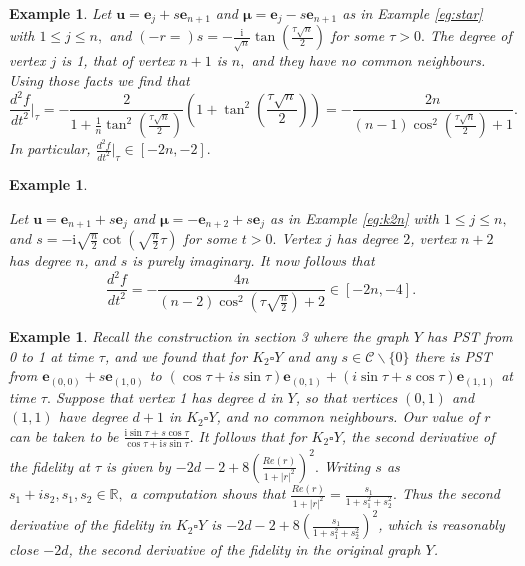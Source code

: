 \documentclass{article}
\numberwithin{equation}{section}
\newtheorem{ex}[lemma]{Example}
\newcommand{\be}{\mathbf e}
\newcommand{\bu}{\mathbf u}
\newcommand{\bmu}{{\boldsymbol{\mu}}}
\def\ii{\mathrm{i}}
\begin{document}
{\begin{ex}\label{eg:starsense} {\rm{
Let $\bu = \be_j+s\be_{n+1}$ and $ \bmu=\be_j-s\be_{n+1}$ as in Example \ref{eg:star} with $1\leq j\leq n,$ and $(-r=) s=-\frac{\ii}{\sqrt{n}}\tan\left(\frac{\tau \sqrt{n}}{2}\right)$ for some $\tau>0.$ The degree of vertex $j$ is 1, that of vertex $n+1$ is $n,$ and they have no common neighbours. 
Using those facts we find that $$\frac{d^2 f}{d t^2}\bigg|_{\tau} =  - 
\frac{2}{1+\frac{1}{n}\tan^2\left(\frac{\tau \sqrt{n}}{2}\right)}\left(
1+\tan^2\left(\frac{\tau \sqrt{n}}{2} \right)\right) = -
\frac{2n}{(n-1)\cos^2\left(\frac{\tau \sqrt{n}}{2}\right)+1}.$$ In particular,     $\frac{d^2 f}{d t^2}\big|_{\tau} \in [-2n,-2].$  }}
\end{ex}

\begin{ex}\label{eg:k2nsense} \rm{Let $\bu=\be_{n+1}+s\be_j$ and $\bmu=-\be_{n+2}+s\be_j$ as in Example \ref{eg:k2n} with $1\leq j\leq n,$ and 
$s=-\ii \sqrt{\frac{n}{2}} \cot\left( \sqrt{\frac{n}{2}} \tau \right)$ for some $t>0.$ Vertex $j$ has degree $2$, vertex $n+2$ has degree $n$, and $s$ is purely imaginary. It now follows that 
$$\frac{d^2 f}{d t^2} = -\frac{4n}{(n-2)\cos^2\left(\tau \sqrt{\frac{n}{2}}\right)  + 2} \in [-2n, -4]. 
$$

}
\end{ex}

\begin{ex}\label{ex:sensitivity_close}\rm{
Recall the  construction in section 3 where the graph $Y$ has PST from 0 to 1 at time $\tau$, and we found that for $K_2 \square Y $ and any $s \in \mathcal{C}\backslash \{0\}$ there is PST from $\be_{(0,0)} + s \be_{(1,0)}$ to  $  (\cos \tau +i s \sin \tau)\be_{(0,1)} + (i \sin \tau + s \cos \tau)\be_{(1,1)}$ at time  $\tau.$ Suppose that vertex 1 has degree $d$ in $Y$, so that vertices $(0,1)$ and $(1,1)$ have degree $d+1$ in  $K_2 \square Y $, and no common neighbours. Our value of $r$ can be taken to be $\frac{\ii \sin \tau + s \cos \tau}{\cos \tau +\ii s \sin \tau}.$ It follows that for $K_2 \square Y $, the second derivative of the fidelity at $\tau$ is given by $-2d-2+8\left(\frac{Re(r)}{1+|r|^2}\right)^2.$ Writing $s$ as $s_1 + is_2, s_1, s_2 \in \mathbb{R},$ a computation shows that $\frac{Re(r)}{1+|r|^2} = \frac{s_1}{1+s_1^2+s_2^2}.$ Thus the second derivative of the fidelity in 
$K_2 \square Y$ is $-2d-2+ 8 \left( \frac{s_1}{1+s_1^2+s_2^2} \right)^2$, which is reasonably close $-2d$, the second derivative of the fidelity in the original graph $Y$. 
} 





\end{ex}}
\end{document}
